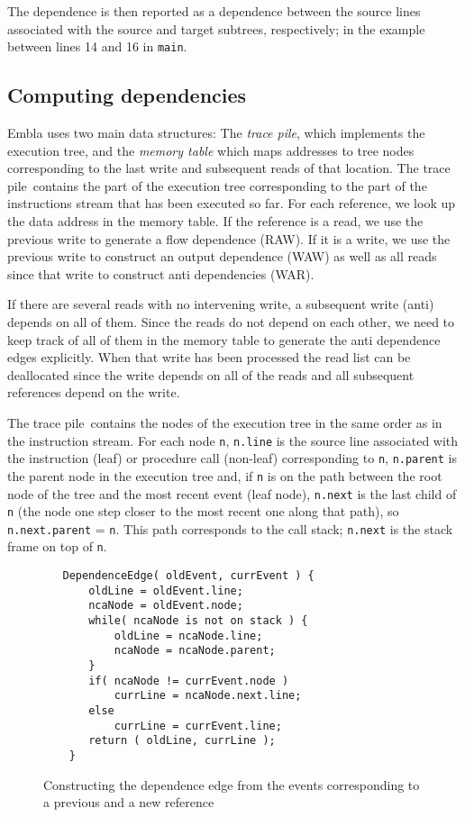 \documentclass{acm_proc_article-sp}
\begin{document}
The dependence is then reported as a dependence between the source lines
associated with the source and target subtrees, respectively; in the example
between lines 14 and 16 in {\tt main}.

\newcommand{\tracepile}{trace pile}

\subsection{Computing dependencies}

Embla uses two main data structures: The {\em \tracepile}, which implements 
the execution tree, and the {\em memory table} which maps addresses to tree
nodes corresponding to the last write and subsequent reads of that
location. The \tracepile\ contains the part of the execution tree
corresponding to the part of the instructions stream that has been
executed so far.
For each reference, we look up the data address in the memory 
table. If the reference is a read, we use the previous write to generate
a flow dependence (RAW). If it is a write, we use the previous write to 
construct an output dependence (WAW) as well as all reads since that 
write to construct anti dependencies (WAR).

If there are several reads with no intervening write, a subsequent write
(anti) depends on all of them. Since the reads do not depend on each other,
we need to keep track of all of them in the memory table to generate the
anti dependence edges explicitly. When that write has been processed 
the read list can be deallocated since
the write depends on all of the reads and
all subsequent references depend on the write.

The \tracepile\ contains the nodes of the execution tree in the same order
as in the instruction stream. For each node {\tt n}, {\tt n.line} is the 
source line associated with the instruction (leaf) or procedure call
(non-leaf) 
corresponding to {\tt n}, {\tt n.parent} is the parent node in the execution tree 
and, if {\tt n} is 
on the path between the root node of the tree and the most recent 
event (leaf node), {\tt n.next} is the last child of {\tt n} (the node one step 
closer to the most recent one
along that path), so {\tt n.next.parent} = {\tt n}. This
path corresponds to the call stack; {\tt n.next} is the stack frame on
top of {\tt n}.

\begin{figure}
\small
\hrulefill
\begin{verbatim}
   DependenceEdge( oldEvent, currEvent ) {
       oldLine = oldEvent.line;
       ncaNode = oldEvent.node;
       while( ncaNode is not on stack ) {
           oldLine = ncaNode.line;
           ncaNode = ncaNode.parent;
       }
       if( ncaNode != currEvent.node )
           currLine = ncaNode.next.line;
       else
           currLine = currEvent.line;
       return ( oldLine, currLine );
    }
\end{verbatim}
\hrulefill
\caption{Constructing the dependence edge from the events corresponding
to a previous and a new reference}
\label{fdepedge}
\end{figure}    
\end{document}
